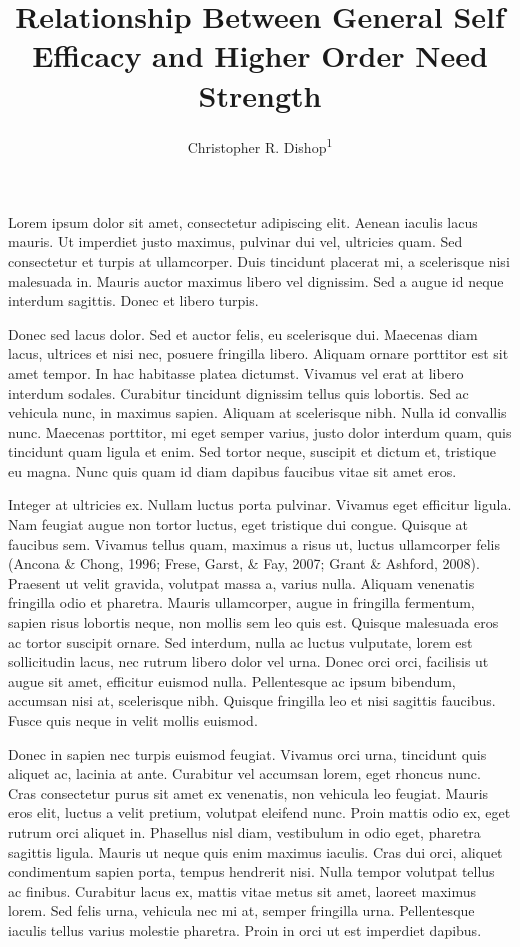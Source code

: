 \documentclass[english,,man]{apa6}
\title{Relationship Between General Self Efficacy and Higher Order Need Strength}
\author{Christopher R. Dishop\textsuperscript{1}}
\date{}
\affiliation{
\vspace{0.5cm}
\textsuperscript{1} Michigan State University}
\begin{document}
\maketitle

Lorem ipsum dolor sit amet, consectetur adipiscing elit. Aenean iaculis lacus mauris. Ut imperdiet justo maximus, pulvinar dui vel, ultricies quam. Sed consectetur et turpis at ullamcorper. Duis tincidunt placerat mi, a scelerisque nisi malesuada in. Mauris auctor maximus libero vel dignissim. Sed a augue id neque interdum sagittis. Donec et libero turpis.

Donec sed lacus dolor. Sed et auctor felis, eu scelerisque dui. Maecenas diam lacus, ultrices et nisi nec, posuere fringilla libero. Aliquam ornare porttitor est sit amet tempor. In hac habitasse platea dictumst. Vivamus vel erat at libero interdum sodales. Curabitur tincidunt dignissim tellus quis lobortis. Sed ac vehicula nunc, in maximus sapien. Aliquam at scelerisque nibh. Nulla id convallis nunc. Maecenas porttitor, mi eget semper varius, justo dolor interdum quam, quis tincidunt quam ligula et enim. Sed tortor neque, suscipit et dictum et, tristique eu magna. Nunc quis quam id diam dapibus faucibus vitae sit amet eros.

Integer at ultricies ex. Nullam luctus porta pulvinar. Vivamus eget efficitur ligula. Nam feugiat augue non tortor luctus, eget tristique dui congue. Quisque at faucibus sem. Vivamus tellus quam, maximus a risus ut, luctus ullamcorper felis (Ancona \& Chong, 1996; Frese, Garst, \& Fay, 2007; Grant \& Ashford, 2008). Praesent ut velit gravida, volutpat massa a, varius nulla. Aliquam venenatis fringilla odio et pharetra. Mauris ullamcorper, augue in fringilla fermentum, sapien risus lobortis neque, non mollis sem leo quis est. Quisque malesuada eros ac tortor suscipit ornare. Sed interdum, nulla ac luctus vulputate, lorem est sollicitudin lacus, nec rutrum libero dolor vel urna. Donec orci orci, facilisis ut augue sit amet, efficitur euismod nulla. Pellentesque ac ipsum bibendum, accumsan nisi at, scelerisque nibh. Quisque fringilla leo et nisi sagittis faucibus. Fusce quis neque in velit mollis euismod.

Donec in sapien nec turpis euismod feugiat. Vivamus orci urna, tincidunt quis aliquet ac, lacinia at ante. Curabitur vel accumsan lorem, eget rhoncus nunc. Cras consectetur purus sit amet ex venenatis, non vehicula leo feugiat. Mauris eros elit, luctus a velit pretium, volutpat eleifend nunc. Proin mattis odio ex, eget rutrum orci aliquet in. Phasellus nisl diam, vestibulum in odio eget, pharetra sagittis ligula. Mauris ut neque quis enim maximus iaculis. Cras dui orci, aliquet condimentum sapien porta, tempus hendrerit nisi. Nulla tempor volutpat tellus ac finibus. Curabitur lacus ex, mattis vitae metus sit amet, laoreet maximus lorem. Sed felis urna, vehicula nec mi at, semper fringilla urna. Pellentesque iaculis tellus varius molestie pharetra. Proin in orci ut est imperdiet dapibus.
\end{document}
